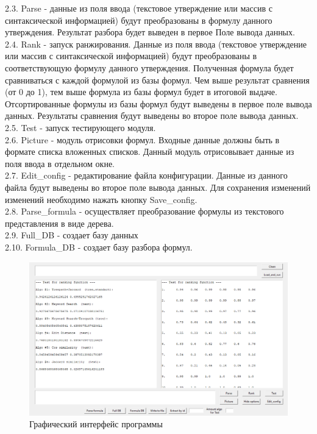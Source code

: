 \documentclass[12pt]{article}
\begin{document}
2.3. Parse - данные из поля ввода (текстовое утверждение или массив с синтаксической информацией) будут преобразованы в формулу данного утверждения. Результат разбора будет выведен в первое Поле вывода данных.\\	

2.4. Rank - запуск ранжирования. Данные из поля ввода (текстовое утверждение или массив с синтаксической информацией) будут преобразованы  в соответствующую формулу данного утверждения.
 Полученная формула будет сравниваться с каждой формулой из базы формул. Чем выше результат сравнения (от 0 до 1), тем выше формула из базы формул будет в итоговой выдаче. Отсортированные формулы из базы формул будут выведены в первое поле вывода данных. Результаты сравнения будут выведены во второе поле вывода данных.  \\
	   
2.5. Test - запуск тестирующего модуля. \\

2.6. Picture - модуль отрисовки формул.   Входные данные должны быть в формате списка вложенных списков. Данный модуль отрисовывает данные из поля ввода в отдельном окне. \\
	
2.7. Edit\_config - редактирование файла конфигурации. Данные из данного файла будут выведены во второе поле вывода данных. Для сохранения изменений изменений необходимо нажать кнопку Save\_config. \\

2.8. Parse\_formula - осуществляет преобразование формулы из текстового представления в виде дерева.\\

2.9. Full\_DB - создает базу данных \\

2.10. Formula\_DB - создает базу разбора формул. \\
	
\begin{figure}
\centering
\includegraphics[scale=0.44]{Picture_1.png}
\caption{Графический интерфейс программы}
\end{figure}
		  
\end{document}
